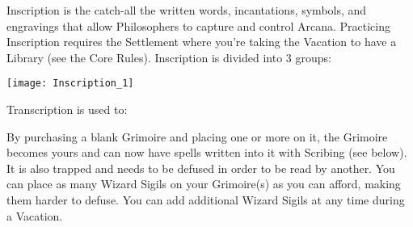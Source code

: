 



Inscription is the catch-all the written words, incantations, symbols, and engravings that allow Philosophers to capture and control Arcana.  Practicing Inscription requires the Settlement where you're taking the Vacation to have a Library (see the Core Rules). Inscription is divided into 3 groups:


  \begin{center}
  \texttt{[image: Inscription\_1]}
  \end{center}




Transcription is used to: 


By purchasing a blank Grimoire and placing one or more  on it, the Grimoire becomes yours and can now have spells written into it with Scribing (see below).  It is also trapped and needs to be defused in order to be read by another.   You can place as many Wizard Sigils on your Grimoire(s) as you can afford, making them harder to defuse. You can add additional Wizard Sigils at any time during a Vacation.


